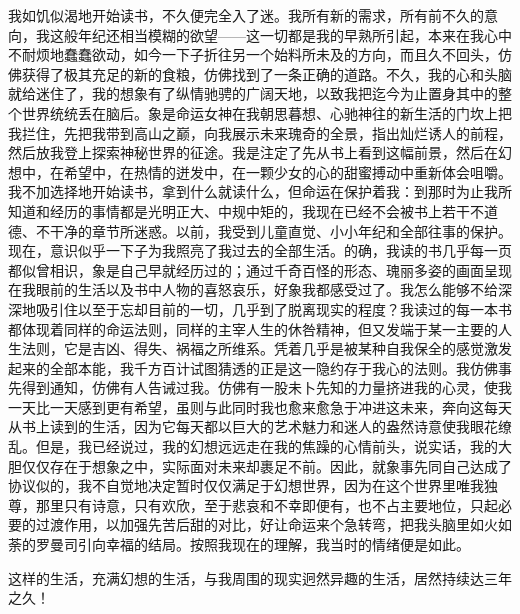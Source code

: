 \documentclass[12pt, UTF8]{ctexbook}
\begin{document}
\par 我如饥似渴地开始读书，不久便完全入了迷。我所有新的需求，所有前不久的意向，我这般年纪还相当模糊的欲望——这一切都是我的早熟所引起，本来在我心中不耐烦地蠢蠢欲动，如今一下子折往另一个始料所未及的方向，而且久不回头，仿佛获得了极其充足的新的食粮，仿佛找到了一条正确的道路。不久，我的心和头脑就给迷住了，我的想象有了纵情驰骋的广阔天地，以致我把迄今为止置身其中的整个世界统统丢在脑后。象是命运女神在我朝思暮想、心驰神往的新生活的门坎上把我拦住，先把我带到高山之巅，向我展示未来瑰奇的全景，指出灿烂诱人的前程，然后放我登上探索神秘世界的征途。我是注定了先从书上看到这幅前景，然后在幻想中，在希望中，在热情的迸发中，在一颗少女的心的甜蜜搏动中重新体会咀嚼。我不加选择地开始读书，拿到什么就读什么，但命运在保护着我：到那时为止我所知道和经历的事情都是光明正大、中规中矩的，我现在已经不会被书上若干不道德、不干净的章节所迷惑。以前，我受到儿童直觉、小小年纪和全部往事的保护。现在，意识似乎一下子为我照亮了我过去的全部生活。的确，我读的书几乎每一页都似曾相识，象是自己早就经历过的；通过千奇百怪的形态、瑰丽多姿的画面呈现在我眼前的生活以及书中人物的喜怒哀乐，好象我都感受过了。我怎么能够不给深深地吸引住以至于忘却目前的一切，几乎到了脱离现实的程度？我读过的每一本书都体现着同样的命运法则，同样的主宰人生的休咎精神，但又发端于某一主要的人生法则，它是吉凶、得失、祸福之所维系。凭着几乎是被某种自我保全的感觉激发起来的全部本能，我千方百计试图猜透的正是这一隐约存于我心的法则。我仿佛事先得到通知，仿佛有人告诫过我。仿佛有一股未卜先知的力量挤进我的心灵，使我一天比一天感到更有希望，虽则与此同时我也愈来愈急于冲进这未来，奔向这每天从书上读到的生活，因为它每天都以巨大的艺术魅力和迷人的盎然诗意使我眼花缭乱。但是，我已经说过，我的幻想远远走在我的焦躁的心情前头，说实话，我的大胆仅仅存在于想象之中，实际面对未来却裹足不前。因此，就象事先同自己达成了协议似的，我不自觉地决定暂时仅仅满足于幻想世界，因为在这个世界里唯我独尊，那里只有诗意，只有欢欣，至于悲哀和不幸即便有，也不占主要地位，只起必要的过渡作用，以加强先苦后甜的对比，好让命运来个急转弯，把我头脑里如火如荼的罗曼司引向幸福的结局。按照我现在的理解，我当时的情绪便是如此。
\par 这样的生活，充满幻想的生活，与我周围的现实迥然异趣的生活，居然持续达三年之久！
\end{document}

